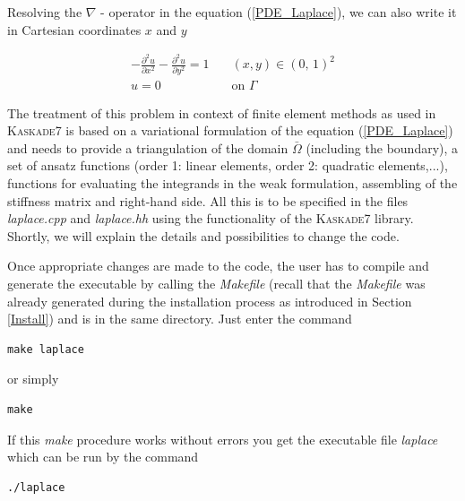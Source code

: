 \documentclass[11pt]{article}
\newcommand{\K}{\textsc{Kaskade7 }}
\begin{document}
Resolving the $\nabla$ - operator in the equation (\ref{PDE_Laplace}), we can also write it in Cartesian coordinates $x$ and $y$

\begin{equation}\label{PDE_LaplaceXY}
\begin{array}{rcl} \displaystyle
 - \frac{\partial^2 u}{ \partial x^2} - \frac{\partial^2 u}{ \partial y^2} = 1 \quad &(x,y)  \in  (0,\,1)^2\\[2mm]
u = 0 \quad & \mbox{on } \Gamma
\end{array}
\end{equation}


The treatment of this problem in context of finite element methods as used in \K is based
on a variational formulation of the equation (\ref{PDE_Laplace}) and needs to provide 
a triangulation of the domain $\bar\Omega$ (including the boundary),
a set of ansatz functions (order 1: linear elements, order 2: quadratic elements,...), functions for
evaluating the integrands in the weak formulation, assembling of the stiffness matrix and right-hand side.
All this is to be specified in the files {\em laplace.cpp} and {\em laplace.hh} using the functionality
of the \K library. Shortly, we will explain the details and possibilities to change the code.

Once appropriate changes are made to the code, the user has to compile and generate the executable by calling the {\em Makefile} (recall that the {\em Makefile} was already generated during the installation process as introduced in Section \ref{Install}) and is in the same directory. Just enter the command

\begin{scriptsize}
\begin{verbatim}
make laplace
\end{verbatim}
\end{scriptsize}

\noindent or simply

\begin{scriptsize}
\begin{verbatim}
make
\end{verbatim}
\end{scriptsize}

\noindent If this {\em make} procedure works without errors you get the executable file {\em laplace} 
which can be run by the command

\begin{scriptsize}
\begin{verbatim}
./laplace
\end{verbatim}
\end{scriptsize}
\end{document}
